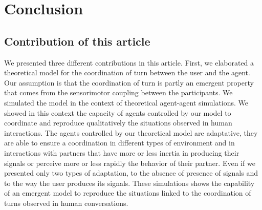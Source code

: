 \section{Conclusion}

\subsection{Contribution of this article}

We presented three different contributions in this article. First, we elaborated a theoretical model for the coordination of turn between the user and the agent. Our assumption is that the coordination of turn is partly an emergent property that comes from the sensorimotor coupling between the participants. We simulated the model in the context of theoretical agent-agent simulations. We showed in this context the capacity of agents controlled by our model to coordinate and reproduce qualitatively the situations observed in human interactions. 
The agents controlled by our theoretical model are adaptative, they are able to ensure a coordination in different types of environment and in interactions with partners that have more or less inertia in producing their signals or perceive more or less rapidly the behavior of their partner. Even if we presented only two types of adaptation, to the absence of presence of signals and to the way the user produces its signals. These simulations shows the capability of an emergent model to reproduce the situations linked to the coordination of turns observed in human conversations.

